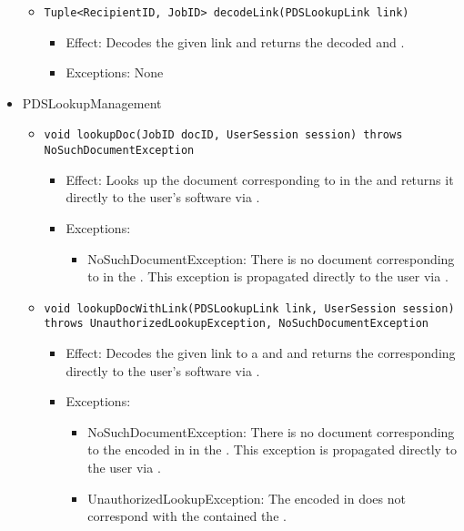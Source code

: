 \begin{itemize}
\begin{itemize}
		\item \texttt{Tuple<RecipientID, JobID> decodeLink(PDSLookupLink link)}
		    \begin{itemize}
                \item Effect: Decodes the given link and returns the decoded  and .
                \item Exceptions: None
            \end{itemize}
    \end{itemize}

	\item PDSLookupManagement
    \begin{itemize}
        \item \texttt{void lookupDoc(JobID docID, UserSession session) throws NoSuchDocumentException}
        \begin{itemize}
            \item Effect: Looks up the document corresponding to  in the  and returns it directly to the user's software via .
            \item Exceptions: 
			\begin{itemize}
				\item NoSuchDocumentException: There is no document corresponding to  in the . This exception is propagated directly to the user via .
			\end{itemize}
        \end{itemize}

        \item \texttt{void lookupDocWithLink(PDSLookupLink link, UserSession session) throws UnauthorizedLookupException, NoSuchDocumentException}
		    \begin{itemize}
                \item Effect: Decodes the given link to a  and  and returns the corresponding  directly to the user's software via .
                \item Exceptions: 
				\begin{itemize}
					\item NoSuchDocumentException: There is no document corresponding to the  encoded in  in the . This exception is propagated directly to the user via .
					\item UnauthorizedLookupException: The  encoded in  does not correspond with the  contained the .
				\end{itemize}
            \end{itemize}


\end{itemize}
\end{itemize}
